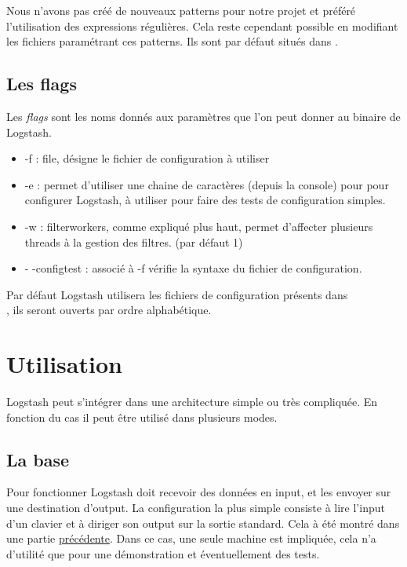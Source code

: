Nous n'avons pas créé de nouveaux patterns pour notre projet et préféré l'utilisation
des expressions régulières. Cela reste cependant possible en modifiant les fichiers 
paramétrant ces patterns. Ils sont par défaut situés dans .



\subsection{Les flags}
Les \emph{flags} sont les noms donnés aux paramètres que l'on peut donner au binaire
de Logstash.

\begin{itemize}
    \item -f : file, désigne le fichier de configuration à utiliser
    \item -e : permet d'utiliser une chaine de caractères (depuis la console) pour
    pour configurer Logstash, à utiliser pour faire des tests de configuration simples.
    \item -w : filterworkers, comme expliqué plus haut, permet d'affecter plusieurs
    threads à la gestion des filtres. (par défaut 1)
    \item - -configtest : associé à -f  vérifie la syntaxe 
    du fichier de configuration.
\end{itemize}

Par défaut Logstash utilisera les fichiers de configuration présents dans \\ 
, ils seront ouverts par ordre alphabétique.


\section{Utilisation}
Logstash peut s'intégrer dans une architecture simple ou très compliquée. En fonction
du cas il peut être utilisé dans plusieurs modes.


\subsection{La base}
Pour fonctionner Logstash doit recevoir des données en input, et les envoyer sur 
une destination d'output.
La configuration la plus simple consiste à lire l'input d'un clavier et à diriger 
son output sur la sortie standard. Cela à été montré dans une partie 
\hyperref[lst:conflogstashminimale]{précédente}.
Dans ce cas, une seule machine est impliquée, cela n'a d'utilité que pour une démonstration
et éventuellement des tests.

